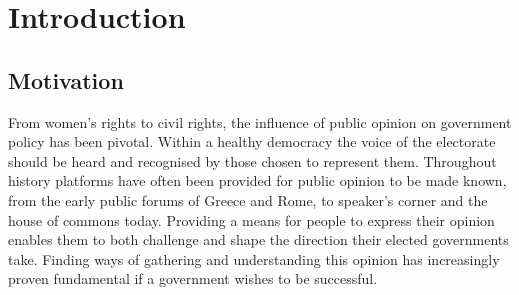
\chapter{Introduction}


\section{Motivation}

From women's rights to civil rights, the influence of public opinion on government policy has been pivotal. Within a healthy democracy the voice of the electorate should be heard and recognised by those chosen to represent them. Throughout history platforms have often been provided for public opinion to be made known, from the early public forums of Greece and Rome, to speaker's corner and the house of commons today. Providing a means for people to express their opinion enables them to both challenge and shape the direction their elected governments take. Finding ways of gathering and understanding this opinion has increasingly proven fundamental if a government wishes to be successful.


